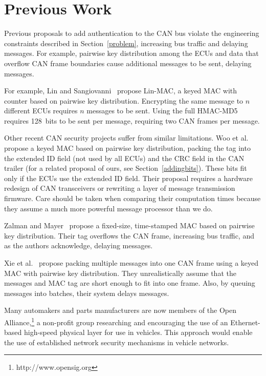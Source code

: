 \section{Previous Work}
\label{previous}

Previous proposals to add authentication to the CAN bus violate the engineering constraints described
in Section~\ref{problem}, increasing bus traffic and delaying messages.  For example, pairwise
key distribution among the ECUs and data that overflow CAN frame boundaries cause additional messages to be sent,
delaying messages.

For example, Lin and Sangiovanni~\cite{Lin-MAC} propose Lin-MAC, a keyed MAC with counter based on
pairwise key distribution.  Encrypting the same message to $n$ different ECUs requires $n$
messages to be sent.   Using the full HMAC-MD5 requires 128~bits to be sent per message, requiring two CAN frames per message.

Other recent CAN security projects suffer from similar limitations. 
Woo et al.~\cite{Woo-14} propose a keyed MAC based on pairwise key distribution,
packing the tag into the extended ID field (not used by all ECUs) and the CRC field in the CAN trailer
(for a related proposal of ours, see Section~\ref{addingbits}). 
These bits fit only if the ECUs use the extended ID field. 
Their proposal requires a hardware redesign of CAN transceivers or rewriting a layer of message transmission firmware.
Care should be taken when comparing their computation times because
they assume a much more powerful message processor than we do. 

Zalman and Mayer~\cite{Zalman-14} propose a fixed-size, time-stamped MAC based on pairwise key distribution.
Their tag overflows the CAN frame, increasing bus traffic, and as the authors acknowledge,
delaying messages.

Xie et al.~\cite{Xie-15} propose packing multiple messages into one CAN frame using a keyed MAC with 
pairwise key distribution.   They unrealistically assume that the messages and MAC tag are short
enough to fit into one frame.  Also, by queuing messages into batches, their system delays messages.


Many automakers and parts manufacturers are now members of the 
Open Alliance,\footnote{http://www.opensig.org}
a non-profit group researching and encouraging the use of an Ethernet-based high-speed physical layer 
for use in vehicles.  This approach would enable the use of 
established network security mechanisms in vehicle networks.

